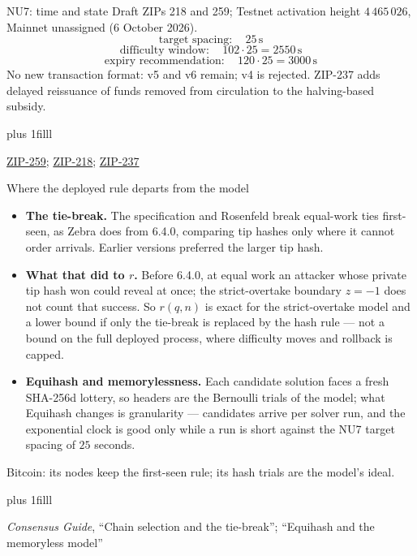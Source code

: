\documentclass[aspectratio=169,11pt]{beamer}
\newcommand{\src}[1]{\par\vskip0pt plus 1filll
  {\fontsize{6}{7.2}\selectfont\color{arbdim}\raggedright #1\par}}
\begin{document}
\begin{frame}{NU7: time and state}
Draft ZIPs 218 and 259; Testnet activation height $4\,465\,026$, Mainnet
unassigned (6 October 2026).
\[
  \text{target spacing}:\quad 25\,\mathrm{s}
\]
\[
  \text{difficulty window}:\quad 102\cdot25 = 2550\,\mathrm{s}
\]
\[
  \text{expiry recommendation}:\quad
  120\cdot25 = 3000\,\mathrm{s}
\]
\medskip
No new transaction format: v5 and v6 remain; v4 is rejected.
ZIP-237 adds delayed reissuance of funds removed from circulation
to the halving-based subsidy.
\src{\href{https://github.com/zcash/zips/pull/1363}{ZIP-259};
  \href{https://zips.z.cash/zip-0218}{ZIP-218};
  \href{https://github.com/zcash/zips/pull/1354}{ZIP-237}}
\end{frame}

\begin{frame}{Where the deployed rule departs from the model}
\begin{itemize}
\item \textbf{The tie-break.} The specification and Rosenfeld break
  equal-work ties first-seen, as Zebra does from 6.4.0, comparing tip
  hashes only where it cannot order arrivals. Earlier versions preferred
  the larger tip hash.
\item \textbf{What that did to $r$.} Before 6.4.0, at equal work an
  attacker whose private tip hash won could reveal at once; the
  strict-overtake boundary $z = -1$ does not count that success. So
  $r(q, n)$ is exact for the strict-overtake model and a lower bound if
  only the tie-break is replaced by the hash rule --- not a bound on the
  full deployed process, where difficulty moves and rollback is capped.
\item \textbf{Equihash and memorylessness.} Each candidate solution
  faces a fresh SHA-256d lottery, so headers are the Bernoulli trials
  of the model; what Equihash changes is granularity --- candidates
  arrive per solver run, and the exponential clock is good only while
  a run is short against the NU7 target spacing of $25$ seconds.
\end{itemize}
\alert{Bitcoin:} its nodes keep the first-seen rule; its hash trials
are the model's ideal.
\src{\emph{Consensus Guide}, ``Chain selection and the tie-break''; ``Equihash
  and the memoryless model''}
\end{frame}
\end{document}
